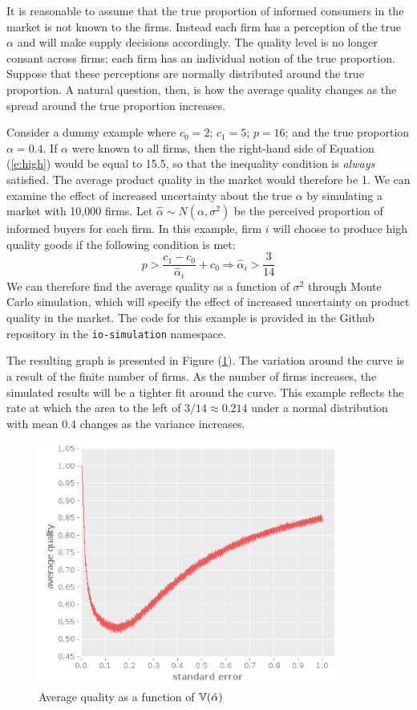\documentclass{article}
\begin{document}
It is reasonable to assume that the true proportion of informed consumers in the market is not known to the firms.  Instead each firm has a perception of the true $\alpha$ and will make supply decisions accordingly.  The quality level is no longer consant across firms; each firm has an individual notion of the true proportion.  Suppose that these perceptions are normally distributed around the true proportion.  A natural question, then, is how the average quality changes as the spread around the true proportion increases.

Consider a dummy example where $c_0 = 2$; $c_1 = 5$; $p = 16$; and the true proportion $\alpha = 0.4$.  If $\alpha$ were known to all firms, then the right-hand side of Equation (\ref{e:high}) would be equal to 15.5, so that the inequality condition is \emph{always} satisfied.  The average product quality in the market would therefore be 1.  We can examine the effect of increased uncertainty about the true $\alpha$ by simulating a market with 10,000 firms.  Let $\hat{\alpha} \sim N(\alpha, \sigma^2)$ be the perceived proportion of informed buyers for each firm.  In this example, firm $i$ will choose to produce high quality goods if the following condition is met:
\begin{equation}
\label{e:est}
p > \frac{c_1 - c_0}{\hat{\alpha}_i} + c_0 \Rightarrow \hat{\alpha}_i > \frac{3}{14}
\end{equation}
We can therefore find the average quality as a function of $\sigma^2$ through Monte Carlo simulation, which will specify the effect of increased uncertainty on product quality in the market.  The code for this example is provided in the Github repository in the \texttt{io-simulation} namespace.  

The resulting graph is presented in Figure (\ref{f:mc}).  The variation around the curve is a result of the finite number of firms.  As the number of firms increases, the simulated results will be a tighter fit around the curve.  This example reflects the rate at which the area to the left of $3/14 \approx 0.214$ under a normal distribution with mean $0.4$ changes as the variance increases.

\begin{figure}[htb]
\centering
\includegraphics[width=10cm]{mc-est.png}
\caption{\label{f:mc}Average quality as a function of $\mathbb{V}(\hat{\alpha})$}
\end{figure}
\end{document}
